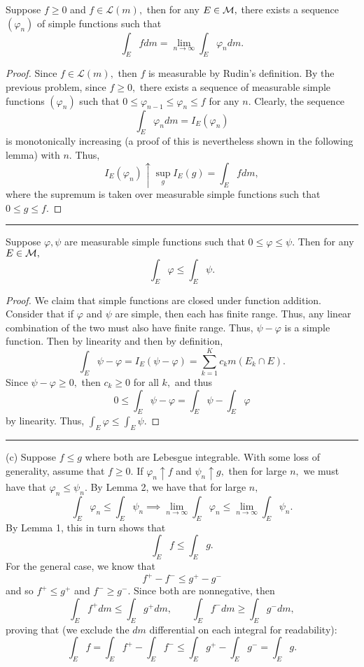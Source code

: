 \documentclass[11pt]{article}
\begin{document}
\begin{solution}
    \begin{lemma}
        Suppose $f \geq 0$ and $f \in \mathcal{L}(m),$ then for any $E\in \cal M,$ there exists a sequence $(\varphi_n)$ of simple functions such that
        \[\int_E f dm= \lim_{n\to \infty}\int_E\varphi_ndm.\] 
    \end{lemma}
    \begin{proof}
        Since $f \in \mathcal{L}(m),$ then $f$ is measurable by Rudin's definition. By the previous problem, since $f \geq 0,$ there exists a sequence of measurable simple functions $(\varphi_n)$ such that $0 \leq \varphi_{n-1} \leq \varphi_n \leq f$ for any $n.$ Clearly, the sequence 
        \[\int_E \varphi_n dm = I_E(\varphi_n)\] is monotonically increasing (a proof of this is nevertheless shown in the following lemma) with $n.$ Thus, 
        \[I_E(\varphi_n)\uparrow \sup_{g} I_E(g) = \int_E f dm,\] where the supremum is taken over measurable simple functions such that $0 \leq g \leq f.$ 
    \end{proof}

\rule{\linewidth}{0.4pt}
    
\begin{lemma}
    Suppose $\varphi, \psi$ are measurable simple functions such that $ 0 \leq \varphi \leq \psi.$ Then  for any $E \in \cal M,$ 
    \[\int_E \varphi  \leq \int_E \psi.\]
\end{lemma}
\begin{proof}
   We claim that simple functions are closed under function addition. Consider that if $\varphi$ and $\psi$ are simple, then each has finite range. Thus, any linear combination of the two must also have finite range. Thus, $\psi - \varphi$ is a simple function. Then by linearity and then by definition,
   \[\int_E \psi - \varphi = I_E(\psi - \varphi) = \sum_{k=1}^K c_k m(E_k \cap E).\] Since $\psi - \varphi \geq 0,$ then $c_k \geq 0$ for all $k,$ and thus 
   \[0 \leq \int_E \psi - \varphi = \int_E \psi - \int_E \varphi\] by linearity. Thus, $\int_E \varphi \leq \int_E \psi.$ 
\end{proof}

\rule{\linewidth}{0.4pt}

(c) Suppose $f \leq g$ where both are Lebesgue integrable. With some loss of generality, assume that $ f\geq 0.$ If $\varphi_n \uparrow f$ and $\psi_n \uparrow g,$ then for large $n,$ we must have that $\varphi_n \leq \psi_n.$ By Lemma 2, we have that for large $n,$
\[\int_E \varphi_n \leq \int_E \psi_n\implies \lim_{n\to \infty}\int_E \varphi_n \leq \lim_{n\to \infty} \int_E \psi_n.\] By Lemma 1, this in turn shows that 
\[\int_E f \leq \int_E g.\] For the general case, we know that 
\[f^+ - f^- \leq g^+ - g^-\] and so $f^+ \leq g^+$ and $f^- \geq g^-.$ Since both are nonnegative, then 
\[\int_E f^+dm \leq \int_E g^+dm, \qquad \int_E f^-dm \geq \int_E g^- dm,\] proving that (we exclude the $dm$ differential on each integral for readability):
\[\int_E f = \int_E f^+ - \int_E f^- \leq \int_E g^+ - \int_E g^- = \int_E g.\]


\end{solution}
\end{document}
